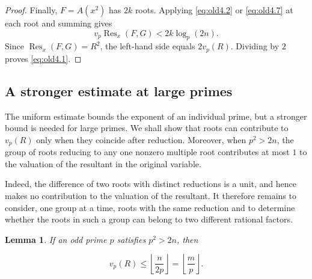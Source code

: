 \documentclass[11pt,a4paper]{article}
\numberwithin{equation}{section}
\newtheorem{lemma}[theorem]{Lemma}
\theoremstyle{definition}
\begin{document}
\begin{proof}
Finally, \(F=A(x^2)\) has \(2k\) roots. Applying \eqref{eq:old4.2} or \eqref{eq:old4.7} at each root and summing gives
\[
v_p\operatorname{Res}_x(F,G)<2k\log_p(2n).
\]
Since \(\operatorname{Res}_x(F,G)=R^2\), the left-hand side equals \(2v_p(R)\). Dividing by \(2\) proves \eqref{eq:old4.1}.
\end{proof}

\subsection{A stronger estimate at large primes}

The uniform estimate bounds the exponent of an individual prime, but a stronger bound is needed for large primes. We shall show that roots can contribute to \(v_p(R)\) only when they coincide after reduction. Moreover, when \(p^2>2n\), the group of roots reducing to any one nonzero multiple root contributes at most \(1\) to the valuation of the resultant in the original variable.

Indeed, the difference of two roots with distinct reductions is a unit, and hence makes no contribution to the valuation of the resultant. It therefore remains to consider, one group at a time, roots with the same reduction and to determine whether the roots in such a group can belong to two different rational factors.

\begin{lemma}\label{prop:large}
If an odd prime \(p\) satisfies \(p^2>2n\), then

\begin{equation}
v_p(R)\le\left\lfloor\frac{n}{2p}\right\rfloor
=\left\lfloor\frac mp\right\rfloor.
\label{eq:old5.1}
\end{equation}
\end{lemma}
\end{document}
